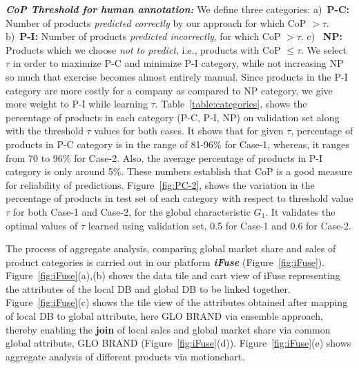 \textbf{\textit{CoP Threshold for human annotation:}} We define three categories: a)~\textbf{P-C:} Number of products \textit{predicted correctly} by our approach for which CoP $> \tau$. b)~\textbf{P-I:} Number of products \textit{predicted incorrectly}, for which CoP $> \tau$. c)~ \textbf{NP:} Products which we choose \textit{not to predict}, i.e., products with CoP $\leq \tau$. We select $\tau$ in order to maximize P-C and minimize P-I category, while not increasing NP so much that exercise becomes almost entirely manual. Since products in the P-I category are more costly for a company as compared to NP category, we give more weight to P-I while learning $\tau$. Table~\ref{table:categories}, shows the percentage of products in each category (P-C, P-I, NP) on validation set along with the threshold $\tau$ values for both cases. It shows that for given $\tau$, percentage of products in P-C category is in the range of 81-96\% for Case-1, whereas, it ranges from 70 to 96\% for Case-2. Also, the average percentage of products in P-I category is only around 5\%. These numbers establish that CoP is a good measure for reliability of predictions. Figure~\ref{fig:PC-2}, shows the variation in the percentage of products in test set of each category with respect to threshold value $\tau$ for both Case-1 and Case-2, for the global characteristic $G_1$. It validates the optimal values of $\tau$ learned using validation set, 0.5 for Case-1 and 0.6 for Case-2.

The process of aggregate analysis, comparing global market share and sales of product categories is carried out in our platform \textbf{\textit{iFuse}}\cite{singh2016visual} (Figure~\ref{fig:iFuse}). Figure~\ref{fig:iFuse}(a),(b) shows the data tile and cart view of iFuse representing the attributes of the local DB and global DB to be linked together. Figure~\ref{fig:iFuse}(c) shows the tile view of the attributes obtained after mapping of local DB to global attribute, here GLO BRAND via ensemble approach, thereby enabling the \textbf{join} of local sales and global market share via common global attribute, GLO BRAND (Figure~\ref{fig:iFuse}(d)). Figure~\ref{fig:iFuse}(e) shows aggregate analysis of different products via motionchart.

